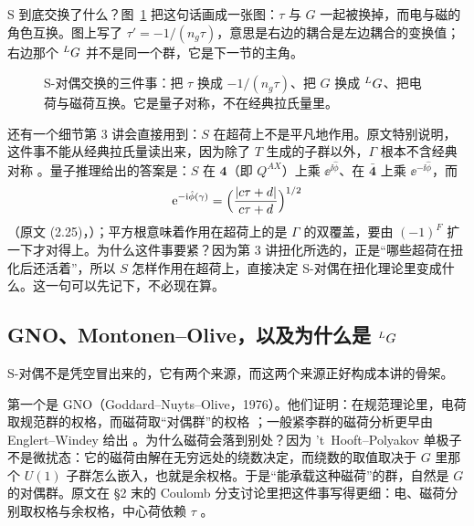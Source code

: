 S 到底交换了什么？图~\ref{fig:sdual} 把这句话画成一张图：$\tau$ 与 $G$ 一起被换掉，而电与磁的角色互换。图上写了 $\tau'=-1/(n_g\tau)$，意思是右边的耦合是左边耦合的变换值；右边那个 ${}^{L}G$ 并不是同一个群，它是下一节的主角。

\begin{figure}[htbp]
\centering
{}
\caption{S-对偶交换的三件事：把 $\tau$ 换成 $-1/(n_g\tau)$、把 $G$ 换成 ${}^{L}G$、把电荷与磁荷互换。它是量子对称，不在经典拉氏量里。}
\label{fig:sdual}
\end{figure}

还有一个细节第 3 讲会直接用到：$S$ 在超荷上不是平凡地作用。原文特别说明，这件事不能从经典拉氏量读出来，因为除了 $T$ 生成的子群以外，$\Gamma$ 根本不含经典对称 。量子推理给出的答案是：$S$ 在 $\mathbf 4$（即 $Q^{AX}$）上乘 $\ee^{\ii\hat\phi}$、在 $\bar{\mathbf 4}$ 上乘 $\ee^{-\ii\hat\phi}$，而
\[
\mathrm{e}^{-\mathrm{i}\hat\phi(\gamma)}=\Bigl(\frac{|c\tau+d|}{c\tau+d}\Bigr)^{1/2}
\]
（原文 (2.25)，）；平方根意味着作用在超荷上的是 $\Gamma$ 的双覆盖，要由 $(-1)^F$ 扩一下才对得上。为什么这件事要紧？因为第 3 讲扭化所选的，正是“哪些超荷在扭化后还活着”，所以 $S$ 怎样作用在超荷上，直接决定 S-对偶在扭化理论里变成什么。这一句可以先记下，不必现在算。

\subsection{GNO、Montonen--Olive，以及为什么是 ${}^{L}G$}

S-对偶不是凭空冒出来的，它有两个来源，而这两个来源正好构成本讲的骨架。

第一个是 GNO（Goddard--Nuyts--Olive，1976）。他们证明：在规范理论里，电荷取规范群的权格，而磁荷取“对偶群”的权格 ；一般紧李群的磁荷分析更早由 Englert--Windey 给出 。为什么磁荷会落到别处？因为 't~Hooft--Polyakov 单极子不是微扰态：它的磁荷由解在无穷远处的绕数决定，而绕数的取值取决于 $G$ 里那个 $U(1)$ 子群怎么嵌入，也就是余权格。于是“能承载这种磁荷”的群，自然是 $G$ 的对偶群。原文在 §2 末的 Coulomb 分支讨论里把这件事写得更细：电、磁荷分别取权格与余权格，中心荷依赖 $\tau$ 。

